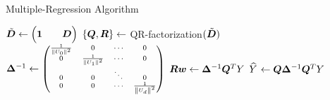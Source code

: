 %
%
%
\begin{frame}{Multiple-Regression Algorithm}
\begin{tightalgo}[H]{\textwidth-18pt}
\Algorithm{} 
$\abD \assign \Bigl(\bone \qquad \bD\Bigr)$ \;
$\{\bQ, \bR\} \assign $ QR-factorization$(\abD)$ \;
$\bDelta^{-1} \assign 
\scriptsize
\matr{
    \frac{1}{\norm{U_0}^2} & 0 & \cdots & 0\\
    0 & \frac{1}{\norm{U_1}^2} & \cdots & 0\\
        0 & 0 & \ddots & 0\\
        0 & 0 & \cdots & \frac{1}{\norm{U_d}^2}\\
    }$ \;
$\bR \bw \assign \bDelta^{-1} \bQ^T Y$ \;
$\hY \assign \bQ \bDelta^{-1} \bQ^T Y$\;
\end{tightalgo}
\end{frame}
